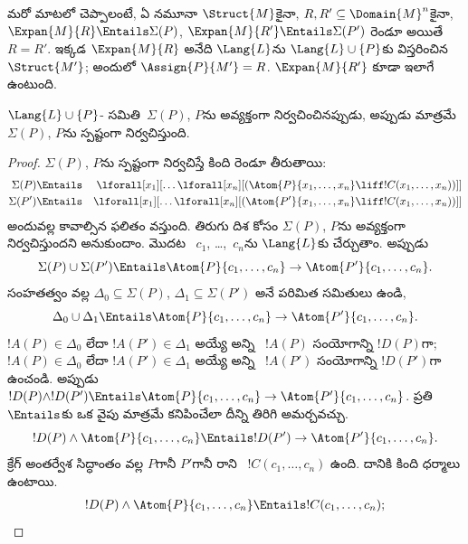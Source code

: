 \documentclass[../../../include/open-logic-section]{subfiles}
\begin{document}
మరో మాటలో చెప్పాలంటే, ఏ నమూనా $\Struct{M}$కైనా,
$R, R' \subseteq \Domain{M}^n$కైనా, $\Expan{M}{R} \Entails
\Sigma(P)$, $\Expan{M}{R'} \Entails \Sigma(P')$ రెండూ అయితే
$R=R'$. ఇక్కడ $\Expan{M}{R}$ అనేది $\Lang{L}$ను
$\Lang{L} \cup \{P\}$కు విస్తరించిన
~$\Struct{M'}$; అందులో
$\Assign{P}{M'} = R$. $\Expan{M}{R'}$ కూడా ఇలాగే ఉంటుంది.

\begin{thm}[బెత్ నిర్వచనీయతా సిద్ధాంతం]
$\Lang{L} \cup\{P\}$-
 సమితి~$\Sigma(P)$, $P$ను అవ్యక్తంగా
నిర్వచించినప్పుడు, అప్పుడు మాత్రమే $\Sigma(P)$, $P$ను స్పష్టంగా
నిర్వచిస్తుంది.
\end{thm}

\begin{proof}
$\Sigma(P)$, $P$ను స్పష్టంగా నిర్వచిస్తే కింది రెండూ తీరుతాయి:
\begin{align*}
  \Sigma(P) & \Entails & \lforall[x_1][\dots \lforall[x_n]
    [(\Atom{P}{x_1,\dots, x_n} \liff !C(x_1,\dots,x_n))]]\\
  \Sigma(P') & \Entails & \lforall[x_1][\dots \lforall[x_n]
    [(\Atom{P'}{x_1,\dots, x_n} \liff !C(x_1,\dots,x_n))]]
\end{align*}
అందువల్ల కావాల్సిన ఫలితం వస్తుంది. తిరుగు దిశ కోసం $\Sigma(P)$,
$P$ను అవ్యక్తంగా నిర్వచిస్తుందని అనుకుందాం. మొదట
~$c_1$, \dots,~$c_n$ను
$\Lang{L}$కు చేర్చుతాం. అప్పుడు
\[
\Sigma(P) \cup \Sigma(P') \Entails
\Atom{P}{c_1, \dots, c_n} \to  \Atom{P'}{c_1, \dots, c_n}.
\]
సంహతత్వం వల్ల $\Delta_0 \subseteq \Sigma(P)$,
$\Delta_1 \subseteq \Sigma(P')$ అనే పరిమిత సమితులు ఉండి,
\[
\Delta_0 \cup \Delta_1 \Entails
\Atom{P}{c_1, \dots, c_n} \to \Atom{P'}{c_1, \dots, c_n}.
\]
$!A(P) \in \Delta_0$ లేదా $!A(P') \in \Delta_1$ అయ్యే అన్ని
~$!A(P)$ సంయోగాన్ని $!D(P)$గా;
$!A(P) \in \Delta_0$ లేదా $!A(P') \in \Delta_1$ అయ్యే అన్ని
~$!A(P')$ సంయోగాన్ని $!D(P')$గా
ఉంచండి. అప్పుడు $!D(P) \land !D(P') \Entails
\Atom{P}{c_1, \dots, c_n} \to \Atom{P'}{c_1,\dots,c_n}$.
ప్రతి  $\Entails$కు ఒక వైపు
మాత్రమే కనిపించేలా దీన్ని తిరిగి అమర్చవచ్చు.
\[
!D(P) \land \Atom{P}{c_1, \dots, c_n} \Entails
!D(P') \to \Atom{P'}{c_1, \dots, c_n}.
\]
క్రేగ్ అంతర్వేశ సిద్ధాంతం వల్ల $P$గానీ $P'$గానీ రాని
~$!C(c_1,\dots, c_n)$ ఉంది. దానికి కింది ధర్మాలు ఉంటాయి.
\begin{align*}
  !D(P) \land \Atom{P}{c_1, \dots, c_n} & \Entails !C(c_1,\dots, c_n); \\

\end{align*}
\end{proof}
\end{document}
